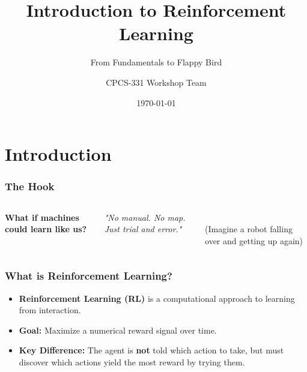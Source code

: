 \documentclass[aspectratio=169]{beamer}
\title{Introduction to Reinforcement Learning}
\subtitle{From Fundamentals to Flappy Bird}
\author{CPCS-331 Workshop Team}
\institute{KAUST Academy AI Summer School Alumni}
\date{\today}
\begin{document}
\begin{frame}
    \titlepage
\end{frame}

\section{Introduction}

\begin{frame}
    \frametitle{The Hook}
    \begin{columns}
        \centering
        \textbf{What if machines could learn like us?}
        \vspace{1cm}

        \textit{"No manual. No map. Just trial and error."}

        \centering
        \\
        (Imagine a robot falling over and getting up again)
    \end{columns}
\end{frame}

\begin{frame}
    \frametitle{What is Reinforcement Learning?}
    \begin{itemize}
        \item \textbf{Reinforcement Learning (RL)} is a computational approach to learning from interaction.
        \item \textbf{Goal:} Maximize a numerical reward signal over time.
        \item \textbf{Key Difference:} The agent is \textbf{not} told which action to take, but must discover which actions yield the most reward by trying them.
    \end{itemize}
\end{frame}
\end{document}
